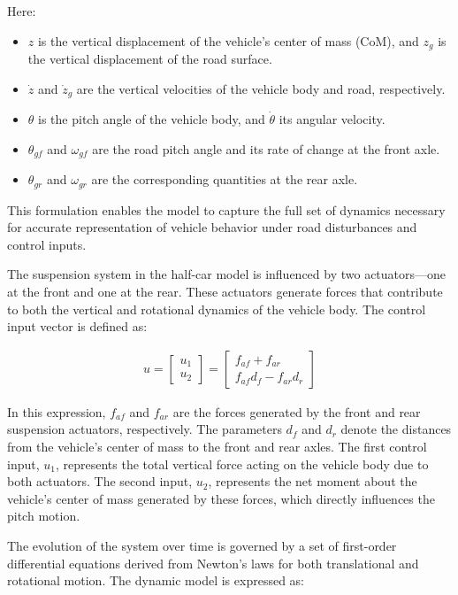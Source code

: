 \documentclass[]{report}
\begin{document}
Here:
\begin{itemize}
	\item $z$ is the vertical displacement of the vehicle’s center of mass (CoM), and $z_g$ is the vertical displacement of the road surface.
	\item $\dot{z}$ and $\dot{z}_g$ are the vertical velocities of the vehicle body and road, respectively.
	\item $\theta$ is the pitch angle of the vehicle body, and $\dot{\theta}$ its angular velocity.
	\item $\theta_{gf}$ and $\omega_{gf}$ are the road pitch angle and its rate of change at the front axle.
	\item $\theta_{gr}$ and $\omega_{gr}$ are the corresponding quantities at the rear axle.
\end{itemize}

This formulation enables the model to capture the full set of dynamics necessary for accurate representation of vehicle behavior under road disturbances and control inputs.



The suspension system in the half-car model is influenced by two actuators—one at the front and one at the rear. These actuators generate forces that contribute to both the vertical and rotational dynamics of the vehicle body. The control input vector is defined as:


\begin{align}
	u = \begin{bmatrix}
		u_1 \\
		u_2
	\end{bmatrix} =
	\begin{bmatrix}
		f_{af} + f_{ar} \\
		f_{af} d_f - f_{ar} d_r
	\end{bmatrix}
\end{align}

In this expression, $f_{af}$ and $f_{ar}$ are the forces generated by the front and rear suspension actuators, respectively. The parameters $d_f$ and $d_r$ denote the distances from the vehicle's center of mass to the front and rear axles. The first control input, $u_1$, represents the total vertical force acting on the vehicle body due to both actuators. The second input, $u_2$, represents the net moment about the vehicle’s center of mass generated by these forces, which directly influences the pitch motion.


The evolution of the system over time is governed by a set of first-order differential equations derived from Newton’s laws for both translational and rotational motion. The dynamic model is expressed as:
\end{document}
